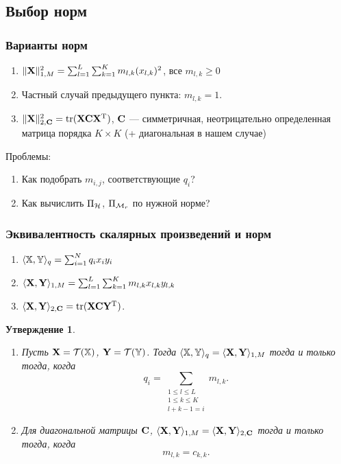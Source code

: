 \documentclass[unicode, notheorems]{beamer}
\newtheorem{proposition}{Утверждение}
\begin{document}
\subsection{Выбор норм}
\begin{frame}
	\frametitle{Варианты норм}
		\begin{enumerate}
			\item $\|\mathbf{X}\|_{1, M}^2 = \sum_{l = 1}^L \sum_{k = 1}^K m_{l, k} (x_{l, k})^2$, все $m_{l, k} \ge 0$
			\item Частный случай предыдущего пункта: $m_{l, k} = 1$.
			\item $\|\mathbf{X}\|_{2, \mathbf{C}}^2 = \text{tr}(\mathbf{X} \mathbf{C} \mathbf{X}^{\mathrm{T}})$, $\mathbf{C}$ --- симметричная, неотрицательно определенная матрица порядка $K \times K$ (+ диагональная в нашем случае)
		\end{enumerate}
		
		\vspace{0.4cm}
		Проблемы:
		\begin{enumerate}
			\item Как подобрать $m_{i, j}$, соответствующие $q_i$?
			\item Как вычислить $\Pi_{\mathcal{H}}$, $\Pi_{\mathcal{M}_r}$ по нужной норме?
		\end{enumerate}
\end{frame}

\begin{frame}
	\frametitle{Эквивалентность скалярных произведений и норм}
	\begin{enumerate}
		\item $\langle \mathbb{X}, \mathbb{Y} \rangle_q = \sum_{i=1}^N q_i x_i  y_i$
		\item $\langle\mathbf{X}, \mathbf{Y} \rangle_{1, M} = \sum_{l = 1}^L \sum_{k = 1}^K m_{l, k} x_{l, k} y_{l, k}$
		\item $\langle\mathbf{X}, \mathbf{Y}\rangle_{2, \mathbf{C}} = \text{tr}(\mathbf{X} \mathbf{C} \mathbf{Y}^{\mathrm{T}})$.
	\end{enumerate}
	\begin{proposition}
		\small
	    \begin{enumerate}
		\item Пусть $\mathbf{X} = \mathcal{T}(\mathbb{X})$,  $\mathbf{Y} = \mathcal{T}(\mathbb{Y})$. Тогда $\langle\mathbb{X},\mathbb{Y}\rangle_q= \langle\mathbf{X},\mathbf{Y}\rangle_{1, M}$ тогда и только тогда, когда
		\begin{equation*}
		q_i = \sum_{\substack{1 \le l \le L \\ 1 \le k \le K \\ l+k-1=i}} m_{l,k}.
		\end{equation*}
		
		\item Для диагональной матрицы $\mathbf{C}$, $\langle \mathbf{X},\mathbf{Y} \rangle_{1, M}= \langle \mathbf{X},\mathbf{Y} \rangle_{2, \mathbf{C}}$ тогда и только тогда, когда
		\begin{equation*}
		m_{l,k}=c_{k,k}.
		\end{equation*}
	    \end{enumerate}
	\end{proposition}
	
\end{frame}
\end{document}

